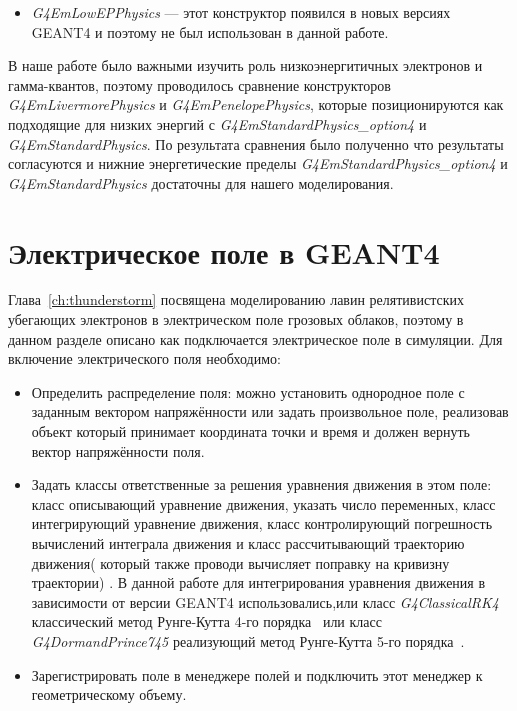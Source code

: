 \begin{itemize}
    \item \textit{G4EmLowEPPhysics} --- этот конструктор появился в новых версиях GEANT4 и поэтому не был использован в данной работе.
\end{itemize}
В наше работе  было важными изучить роль низкоэнергитичных электронов и гамма-квантов, поэтому проводилось сравнение конструкторов  \textit{G4EmLivermorePhysics} и \textit{G4EmPenelopePhysics}, которые позиционируются как подходящие для низких энергий с \textit{G4EmStandardPhysics\_option4} и \textit{G4EmStandardPhysics}. По результата сравнения было полученно что результаты согласуются и нижние энергетические пределы  \textit{G4EmStandardPhysics\_option4} и \textit{G4EmStandardPhysics}  достаточны для нашего моделирования.

\section{Электрическое поле в GEANT4 }\label{sec:theory/efield}
Глава~\ref{ch:thunderstorm} посвящена моделированию лавин релятивистских убегающих электронов в электрическом поле грозовых облаков, поэтому в данном разделе описано как подключается электрическое поле в симуляции. Для включение электрического поля необходимо: 
\begin{itemize}
    \item Определить распределение поля: можно установить однородное поле с заданным вектором напряжённости или задать произвольное поле, реализовав объект который принимает координата точки и время и должен вернуть вектор напряжённости поля.
    \item Задать классы ответственные за решения уравнения движения в этом поле: класс описывающий уравнение движения, указать число переменных, класс интегрирующий уравнение движения, класс контролирующий погрешность вычислений интеграла движения и класс рассчитывающий траекторию движения( который также проводи вычисляет поправку на кривизну траектории) . В данной работе для интегрирования уравнения движения в зависимости от версии GEANT4 использовались,или класс \textit{G4ClassicalRK4} классический метод Рунге-Кутта 4-го порядка~\cite{fedorenko1994} или класс \textit{G4DormandPrince745} реализующий метод Рунге-Кутта 5-го порядка~\cite{dormand1980family}. 
    \item Зарегистрировать поле в менеджере полей и подключить этот менеджер к геометрическому объему.
\end{itemize}

